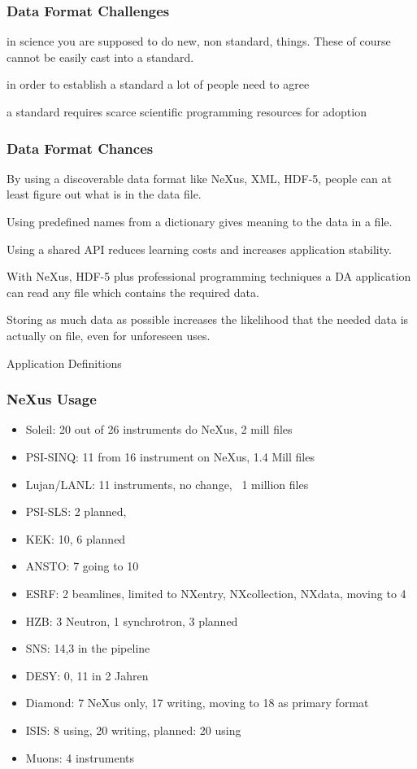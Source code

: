 \documentclass{beamer}
\begin{document}
\begin{frame} \frametitle{Data Format Challenges}
\begin{description}
\item<1->[Challenge 1] in science you are supposed to do new, non standard, things.  
 These of course cannot be easily cast into a standard.
\item<2->[Challenge 2] in order to establish a standard a lot of people need to agree
\item<3->[Challenge 3] a standard requires scarce scientific  programming resources for adoption 
\end{description}
\end{frame}

\begin{frame} \frametitle{Data Format Chances}
\begin{description}
\item<1->[Chance 1] By using a discoverable data format like NeXus, XML, HDF-5, people can at 
 least figure out  what is in the data file. 
\item<2->[Chance 2] Using predefined names from a dictionary gives meaning to the data in a file.
\item<3->[Chance 3] Using a shared API reduces learning costs and increases application stability.
\item<4->[Chance 4] With NeXus, HDF-5 plus professional programming techniques a DA application can 
 read any file which contains the required data.
\item<5->[Chance 5] Storing as much data as possible increases the likelihood that the needed 
 data is actually on file, even for unforeseen uses. 
\item<6->[Chance 6] Application Definitions
\end{description}
\end{frame}


\begin{frame}
\frametitle{NeXus Usage}
\begin{itemize}
\item Soleil: 20 out of 26 instruments do NeXus, 2 mill files
\item PSI-SINQ: 11 from 16 instrument on NeXus, 1.4 Mill files
\item Lujan/LANL: 11 instruments, no change, ~1 million files
\item PSI-SLS: 2 planned, 
\item KEK: 10, 6 planned
\item ANSTO: 7 going to 10
\item ESRF: 2 beamlines, limited to NXentry, NXcollection, NXdata, moving to 4
\item HZB: 3 Neutron, 1 synchrotron, 3 planned 
\item SNS: 14,3 in the pipeline
\item DESY: 0, 11 in 2 Jahren
\item Diamond: 7 NeXus only, 17 writing, moving to 18 as primary format
\item ISIS: 8 using, 20 writing, planned: 20 using
\item Muons: 4 instruments
\end{itemize}
\end{frame}
\end{document}
